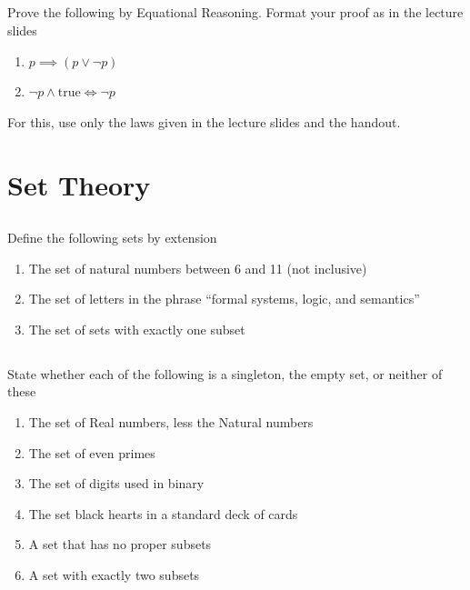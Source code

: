 \documentclass[twocolumn]{article}
\newcommand\mrk[1]{}
\begin{document}
\subsection{}

Prove the following by Equational Reasoning. Format your proof as in the lecture slides

\begin{enumerate}
    \item $p \implies (p \vee \neg p)$ \mrk{2}
    \item $\neg p \wedge \text{true} \Longleftrightarrow \neg p$ \mrk{2}
\end{enumerate}

For this, use only the laws given in the lecture slides and the handout.

\clearpage
\section{Set Theory}

\subsection{}

    Define the following sets by extension

    \begin{enumerate}
        \item The set of natural numbers between 6 and 11 (not inclusive) \mrk{1}
        \item The set of letters in the phrase ``formal systems, logic, and semantics'' \mrk{1}
        \item The set of sets with exactly one subset \mrk{1}
    \end{enumerate}

\subsection{}

    State whether each of the following is a singleton, the empty set, or neither of these

    \begin{enumerate}
        \item The set of Real numbers, less the Natural numbers \mrk{1}
        \item The set of even primes \mrk{1}
        \item The set of digits used in binary \mrk{1}
        \item The set black hearts in a standard deck of cards \mrk{1}
        \item A set that has no proper subsets \mrk{1}
        \item A set with exactly two subsets \mrk{1}
    \end{enumerate}
\end{document}
